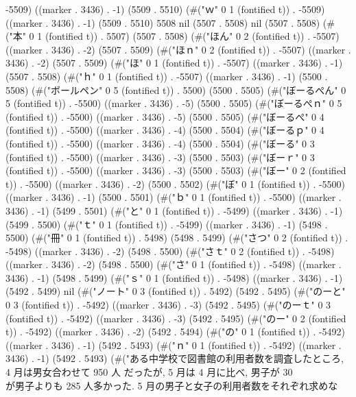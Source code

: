 -5509) ((marker . 3436) . -1) (5509 . 5510) (#("ｗ" 0 1 (fontified t)) . -5509) ((marker . 3436) . -1) (5509 . 5510) 5508 nil (5507 . 5508) nil (5507 . 5508) (#("本" 0 1 (fontified t)) . 5507) (5507 . 5508) (#("ほん" 0 2 (fontified t)) . -5507) ((marker . 3436) . -2) (5507 . 5509) (#("ほｎ" 0 2 (fontified t)) . -5507) ((marker . 3436) . -2) (5507 . 5509) (#("ほ" 0 1 (fontified t)) . -5507) ((marker . 3436) . -1) (5507 . 5508) (#("ｈ" 0 1 (fontified t)) . -5507) ((marker . 3436) . -1) (5500 . 5508) (#("ボールペン" 0 5 (fontified t)) . 5500) (5500 . 5505) (#("ぼーるぺん" 0 5 (fontified t)) . -5500) ((marker . 3436) . -5) (5500 . 5505) (#("ぼーるぺｎ" 0 5 (fontified t)) . -5500) ((marker . 3436) . -5) (5500 . 5505) (#("ぼーるぺ" 0 4 (fontified t)) . -5500) ((marker . 3436) . -4) (5500 . 5504) (#("ぼーるｐ" 0 4 (fontified t)) . -5500) ((marker . 3436) . -4) (5500 . 5504) (#("ぼーる" 0 3 (fontified t)) . -5500) ((marker . 3436) . -3) (5500 . 5503) (#("ぼーｒ" 0 3 (fontified t)) . -5500) ((marker . 3436) . -3) (5500 . 5503) (#("ぼー" 0 2 (fontified t)) . -5500) ((marker . 3436) . -2) (5500 . 5502) (#("ぼ" 0 1 (fontified t)) . -5500) ((marker . 3436) . -1) (5500 . 5501) (#("ｂ" 0 1 (fontified t)) . -5500) ((marker . 3436) . -1) (5499 . 5501) (#("と" 0 1 (fontified t)) . -5499) ((marker . 3436) . -1) (5499 . 5500) (#("ｔ" 0 1 (fontified t)) . -5499) ((marker . 3436) . -1) (5498 . 5500) (#("冊" 0 1 (fontified t)) . 5498) (5498 . 5499) (#("さつ" 0 2 (fontified t)) . -5498) ((marker . 3436) . -2) (5498 . 5500) (#("さｔ" 0 2 (fontified t)) . -5498) ((marker . 3436) . -2) (5498 . 5500) (#("さ" 0 1 (fontified t)) . -5498) ((marker . 3436) . -1) (5498 . 5499) (#("ｓ" 0 1 (fontified t)) . -5498) ((marker . 3436) . -1) (5492 . 5499) nil (#("ノート" 0 3 (fontified t)) . 5492) (5492 . 5495) (#("のーと" 0 3 (fontified t)) . -5492) ((marker . 3436) . -3) (5492 . 5495) (#("のーｔ" 0 3 (fontified t)) . -5492) ((marker . 3436) . -3) (5492 . 5495) (#("のー" 0 2 (fontified t)) . -5492) ((marker . 3436) . -2) (5492 . 5494) (#("の" 0 1 (fontified t)) . -5492) ((marker . 3436) . -1) (5492 . 5493) (#("ｎ" 0 1 (fontified t)) . -5492) ((marker . 3436) . -1) (5492 . 5493) (#("ある中学校で図書館の利用者数を調査したところ, 4 月は男女合わせて 950 人
 だったが, 5 月は 4 月に比べ, 男子が 30 \\%
 が男子よりも 285 人多かった. 5 月の男子と女子の利用者数をそれぞれ求めな
